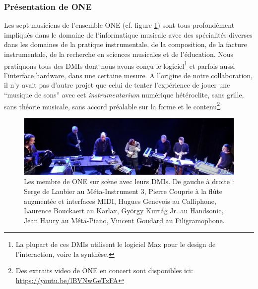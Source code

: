 \subsubsection{Présentation de ONE}
\noindent Les sept musiciens de l'ensemble ONE (cf. figure \ref{fig:notation:one-fullband}) sont tous profondément impliqués dans le domaine de l'informatique musicale avec des spécialités diverses dans les domaines de la pratique instrumentale, de la composition, de la facture instrumentale, de la recherche en sciences musicales et de l'éducation. Nous pratiquons tous des \glspl{DMI} dont nous avons conçu le logiciel\footnote{La plupart de ces \glspl{DMI} utilisent le logiciel Max pour le design de l'interaction, voire la synthèse.} et parfois aussi l'interface hardware, dans une certaine mesure.
A l'origine de notre collaboration, il n'y avait pas d'autre projet que celui de tenter l'expérience de jouer une ``musique de sons'' avec cet \textit{instrumentarium} numérique hétéroclite, sans grille, sans théorie musicale, sans accord préalable sur la forme et le contenu\footnote{Des extraits video de ONE en concert sont disponibles ici: \url{https://youtu.be/lBVNwGeTxFA}}.
\begin{figure}[!htbp]
	\captionsetup{format=plain}%
	\includegraphics[width=\textwidth]{gfx/notation/ONE-fullBand.png}
	\caption[Les membres de ONE et leurs DMIs]{Les membre de ONE sur scène avec leurs \glspl{DMI}. De gauche à droite : Serge de Laubier au Méta-Instrument 3, Pierre Couprie à la flûte augmentée et interfaces MIDI, Hugues Genevois au Calliphone, Laurence Bouckaert au Karlax, György Kurtág Jr. au Handsonic, Jean Haury au Méta-Piano, Vincent Goudard au Filigramophone.}
	\label{fig:notation:one-fullband}
\end{figure}

